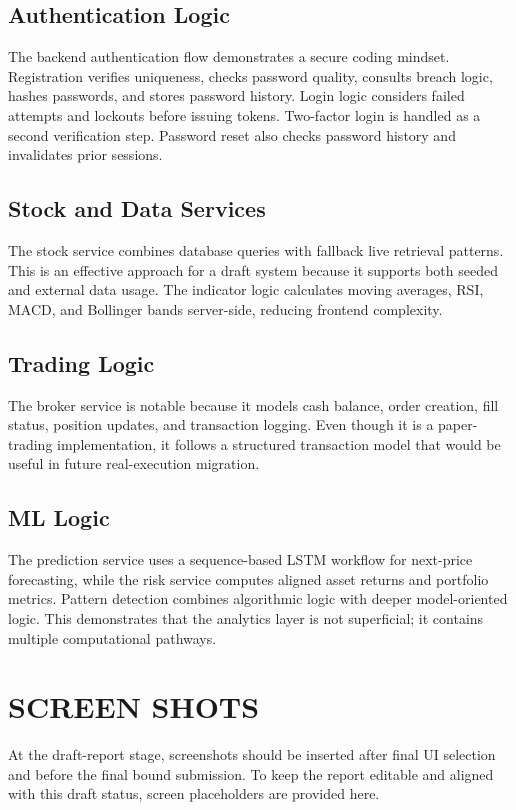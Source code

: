 \documentclass[12pt,a4paper]{report}
\begin{document}
\subsection{Authentication Logic}
The backend authentication flow demonstrates a secure coding mindset. Registration verifies uniqueness, checks password quality, consults breach logic, hashes passwords, and stores password history. Login logic considers failed attempts and lockouts before issuing tokens. Two-factor login is handled as a second verification step. Password reset also checks password history and invalidates prior sessions.

\subsection{Stock and Data Services}
The stock service combines database queries with fallback live retrieval patterns. This is an effective approach for a draft system because it supports both seeded and external data usage. The indicator logic calculates moving averages, RSI, MACD, and Bollinger bands server-side, reducing frontend complexity.

\subsection{Trading Logic}
The broker service is notable because it models cash balance, order creation, fill status, position updates, and transaction logging. Even though it is a paper-trading implementation, it follows a structured transaction model that would be useful in future real-execution migration.

\subsection{ML Logic}
The prediction service uses a sequence-based LSTM workflow for next-price forecasting, while the risk service computes aligned asset returns and portfolio metrics. Pattern detection combines algorithmic logic with deeper model-oriented logic. This demonstrates that the analytics layer is not superficial; it contains multiple computational pathways.

\section{SCREEN SHOTS}
At the draft-report stage, screenshots should be inserted after final UI selection and before the final bound submission. To keep the report editable and aligned with this draft status, screen placeholders are provided here.
\end{document}
